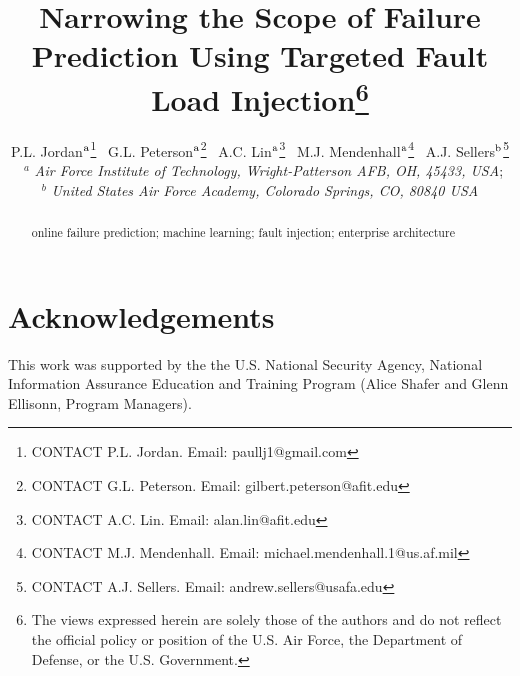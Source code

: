 \documentclass[]{tEIS2e}
\begin{document}

\title{Narrowing the Scope of Failure Prediction Using Targeted Fault Load
Injection\footnote{The views expressed herein are solely those of the authors
and do not reflect the official policy or position of the U.S. Air Force, the
Department of Defense, or the U.S.  Government.}}


\author{P.L. Jordan$^{\rm a}$\thanks{CONTACT P.L. Jordan. Email: paullj1@gmail.com} \
        G.L. Peterson$^{\rm a}$\thanks{CONTACT G.L. Peterson. Email: gilbert.peterson@afit.edu} \
        A.C. Lin$^{\rm a}$\thanks{CONTACT A.C. Lin. Email: alan.lin@afit.edu} \
        M.J. Mendenhall$^{\rm a}$\thanks{CONTACT M.J. Mendenhall. Email: michael.mendenhall.1@us.af.mil} \
        A.J. Sellers$^{\rm b}$\thanks{CONTACT A.J. Sellers. Email: andrew.sellers@usafa.edu}\\\vspace{6pt} \
        $^{a}${%
          \em{Air Force Institute of Technology, %
              Wright-Patterson AFB, OH, 45433, USA}}; \\
        $^{b}${%
          \em{United States Air Force Academy, %
              Colorado Springs, CO, 80840 USA}}}
  
\maketitle

\begin{abstract}


\begin{keywords}
online failure prediction; machine learning; fault injection; enterprise
architecture
\end{keywords}

\end{abstract}

\clearpage


\section*{Acknowledgements}
This work was supported by the the U.S. National Security Agency, National
Information Assurance Education and Training Program (Alice Shafer and Glenn
Ellisonn, Program Managers).


 

\label{lastpage}
\end{document}
